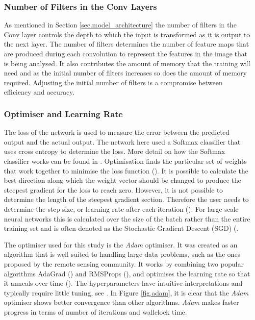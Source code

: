 \subsubsection{Number of Filters in the Conv Layers}
As mentioned in Section \ref{sec.model_architecture} the number of filters in the Conv layer controls the depth to which the input is transformed as it is output to the next layer. The number of filters determines the number of feature maps that are produced during each convolution to represent the features in the image that is being analysed. It also contributes the amount of memory that the training will need and as the initial number of filters increases so does the amount of memory required. Adjusting the initial number of filters is a compromise between efficiency and accuracy. 

\subsubsection{Optimiser and Learning Rate}
The loss of the network is used to measure the error between the predicted output and the actual output. The network here used a Softmax classifier that uses cross entropy to determine the loss. More detail on how the Softmax classifier works can be found in \citet{Richmond19b}. Optimisation finds the particular set of weights that work together to minimise the loss function (\cite{Karpathy_opt}). It is possible to calculate the best direction along which the weight vector should be changed to produce the steepest gradient for the loss to reach zero. However, it is not possible to determine the length of the steepest gradient section. Therefore the user needs to determine the step size, or learning rate after each iteration (\cite{Karpathy_opt}). For large scale neural networks this is calculated over the size of the batch rather than the entire training set and is often denoted as the Stochastic Gradient Descent (SGD) (\cite{Bottou98,Sutskever13}.
\par 
The optimiser used for this study is the \textit{Adam} optimiser. It was created as an algorithm that is well suited to handling large data problems, such as the ones proposed by the remote sensing community. It works by combining two popular algorithms AdaGrad (\cite{duchi11}) and RMSProps (\cite{tielman12}), and optimises the learning rate so that it anneals over time (\cite{kingma14}). The hyperparameters have intuitive interpretations and typically require little tuning, see \citet{kingma14}. In Figure \ref{fig.adam}, it is clear that the \textit{Adam} optimiser shows better convergence than other algorithms. \textit{Adam} makes faster progress in terms of number of iterations and wallclock time.

